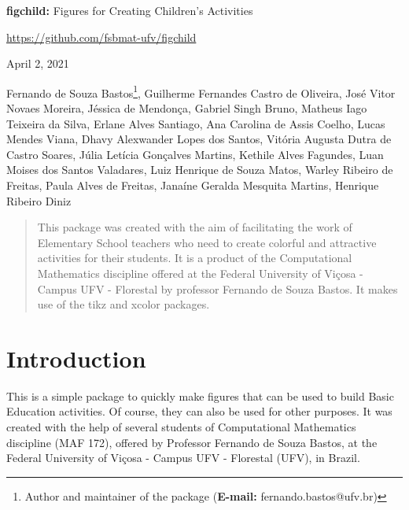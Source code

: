 \documentclass{article}
\begin{document}
\begin{titlepage}

\begin{center}

\textbf{figchild:} Figures for Creating Children's Activities

\vspace{0.5cm}

\url{https://github.com/fsbmat-ufv/figchild}

\vspace{0.5cm}

April 2, 2021

\end{center}

\vspace{2cm}



 Fernando de Souza Bastos\footnote{Author and maintainer of the package (\textbf{E-mail:} fernando.bastos@ufv.br)}, 
 Guilherme Fernandes Castro de Oliveira, 
 José Vitor Novaes Moreira,
 Jéssica de Mendonça,
 Gabriel Singh Bruno,
 Matheus Iago Teixeira da Silva,
 Erlane Alves Santiago,
 Ana Carolina de Assis Coelho,
 Lucas Mendes Viana,
 Dhavy Alexwander Lopes dos Santos,
 Vitória Augusta Dutra de Castro Soares,
 Júlia Letícia Gonçalves Martins,
 Kethile Alves Fagundes,
 Luan Moises dos Santos Valadares,
 Luiz Henrique de Souza Matos,
 Warley Ribeiro de Freitas,
 Paula Alves de Freitas,
 Janaíne Geralda Mesquita Martins,
 Henrique Ribeiro Diniz

\end{titlepage}

\begin{abstract}
This package was created with the aim of facilitating the work of Elementary School teachers who need to create colorful and attractive activities for their students. It is a product of the Computational Mathematics discipline offered at the Federal University of Viçosa - Campus UFV - Florestal by professor Fernando de Souza Bastos. It makes use of the tikz and xcolor packages.
\end{abstract}

\tableofcontents

\listoftables

\section{Introduction}

\hspace{\parindent}This is a simple package to quickly make figures that can be used to build Basic Education activities. Of course, they can also be used for other purposes. It was created with the help of several students of Computational Mathematics discipline (MAF 172), offered by Professor Fernando de Souza Bastos, at the Federal University of Viçosa - Campus UFV - Florestal (UFV), in Brazil.
\end{document}
